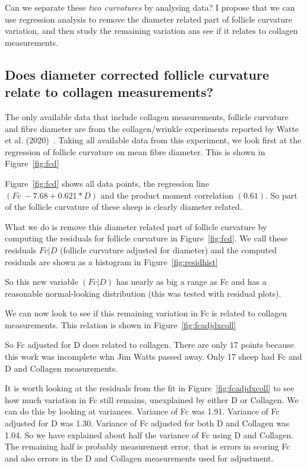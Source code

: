 \documentclass{article}
\begin{document}
Can we separate these {\em two curvatures} by analysing data?  I propose that we can use regression analysis to remove the diameter related part of follicle curvature variation, and then study the remaining variation ans see if it relates to collagen measurements.

\subsection{ Does diameter corrected follicle curvature relate to collagen measurements?}
The only available data that include collagen measurements, follicle curvature and fibre diameter are  from the collagen/wrinkle experiments reported by Watte et al. (2020)~\cite{watts-2020}. Taking all available data from this experiment, we look first at the regression of follicle curvature on mean fibre diameter. This is shown in Figure~\ref{fig:fcd}

Figure~\ref{fig:fcd} shows all data points, the regression line $(Fc ~  -7.68   + 0.621 * D)$ and the product moment correlation $(0.61)$. So part of the follicle curvature of these sheep is clearly diameter related. 

What we do is remove this diameter related part of follicle curvature by computing the residuals for follicle curvature in Figure~\ref{fig:fcd}. We call these residuals $Fc | D$ (follicle curvature adjusted for diameter) and the computed residuals are shown as a histogram in Figure~\ref{fig:residhist}

So this new variable $(Fc | D)$ has nearly as big a range as Fc and has a reasonable normal-looking distribution (this was tested with residual plots).

We can now look to see if this remaining variation in Fc is related to collagen measurements. This relation is shown in Figure~\ref{fig:fcadjdxcoll}

So Fc adjusted for D does related to collagen. There are only 17 points because this work was incomplete whn Jim Watts passed away. Only 17 sheep had Fc and D and Collagen measurements.

It is worth looking at the residuals from the fit in Figure~\ref{fig:fcadjdxcoll} to see how much variation in Fc still remains, unexplained by either D or Collagen.  We can do this by looking at variances. Variance of Fc was 1.91. Variance of Fc adjusted for D was 1.30. Variance of Fc adjusted for both D and Collagen was 1.04. So we have explained about half the variance of Fc using D and Collagen. The remaining half is probably measurement error, that is errors in scoring Fc and also errors in the D and Collagen measurements used for adjustment.
\end{document}
